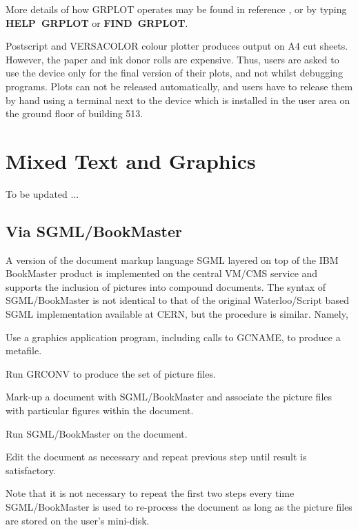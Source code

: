 More details of how GRPLOT operates may be found in reference
\cite{bib-grref}, or by typing {\bf HELP~GRPLOT} or
{\bf FIND~GRPLOT}.
\begin{note}
Postscript and VERSACOLOR colour plotter produces output on
A4 cut sheets. However, the paper and ink donor rolls are expensive.
Thus, users are asked to use the device only for the final
version of their plots, and not whilst debugging programs.
Plots can not be released automatically, and users have to release them by
hand using a terminal next to the device
which is installed in the user area on the ground floor of
building 513.
\end{note}
\section{\protect\label{sec:sgmlgra}Mixed Text and Graphics}
\Lit{$==>$} To be updated ...
\subsection{Via SGML/BookMaster}
 
A version of the document markup language SGML layered on top of the
IBM BookMaster product \cite{CERNSGM1} is implemented on the central
VM/CMS service and supports the inclusion of pictures into compound
documents.
The syntax of SGML/BookMaster is not identical to that of the original
Waterloo/Script based SGML implementation available at CERN, but the procedure
is similar. Namely,
\begin{OL}
\item Use a graphics application program, including calls to GCNAME,
to produce a metafile.
\item Run GRCONV to produce the set of picture files.
\item Mark-up a document with SGML/BookMaster and associate the picture files
with particular figures within the document.
\item Run SGML/BookMaster on the document.
\item Edit the document as necessary and repeat previous step until
result is satisfactory.
\end{OL}
Note that it is not necessary to repeat the first two steps every time
SGML/BookMaster is used to re-process the document as long as the picture
files are stored on the user's mini-disk.
 
